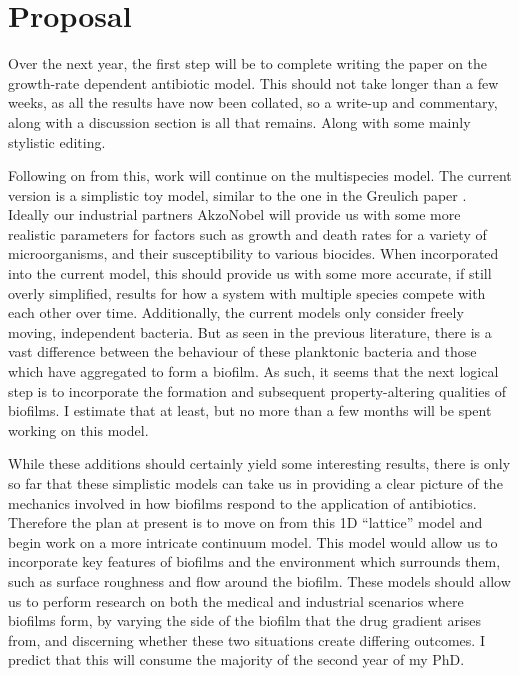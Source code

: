 \documentclass[a4paper,12pt]{article}
\begin{document}
\section{Proposal}

Over the next year, the first step will be to complete writing the paper on the growth-rate dependent antibiotic model.  This should not take longer than a few weeks, as all 
the results have now been collated, so a write-up and commentary, along with a discussion section is all that remains.  Along with some mainly stylistic editing.

Following on from this, work will continue on the multispecies model.  The current version is a simplistic toy model, similar to the one in the 
Greulich paper \cite{bioref:Greulich-growthDependentAntibiotics}.  Ideally our industrial partners AkzoNobel will provide us with some more realistic parameters for factors such as 
growth and death rates for a variety of microorganisms, and their susceptibility to various biocides.  When incorporated into the current model, this should provide us with some more 
accurate, if still overly simplified, results for how a system with multiple species compete with each other over time.  Additionally, the current models only consider freely 
moving, independent bacteria.  But as seen in the previous literature, there is a vast difference between the behaviour of these  planktonic bacteria and those which have 
aggregated to form a biofilm.  As such, it seems that the next logical step is to incorporate the formation and subsequent property-altering qualities of biofilms.  I estimate 
that at least, but no more than a few months will be spent working on this model.

While these additions should certainly yield some interesting results, there is only so far that these simplistic models can take us in providing a clear picture of the mechanics 
involved in how biofilms respond to the application of antibiotics.  Therefore the plan at present is to move on from this 1D ``lattice'' model and begin work on a more 
intricate continuum model.  This model would allow us to incorporate key features of biofilms and the environment which surrounds them, such as surface roughness and flow around 
the biofilm.  These models should allow us to perform research on both the medical and industrial scenarios where biofilms form, by varying the side of the biofilm that the 
drug gradient arises from, and discerning whether these two situations create differing outcomes.  I predict that this will consume the majority of the second year of my PhD.
\end{document}
